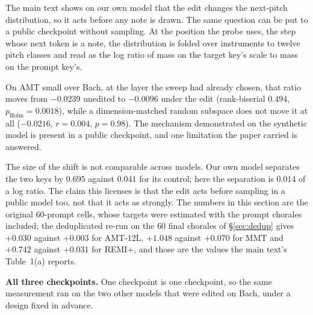 \documentclass{article}
\begin{document}
The main text shows on our own model that the edit changes the next-pitch distribution,
so it acts before any note is drawn. The same question can be put to a public
checkpoint without sampling. At the position the probe uses, the step whose next
token is a note, the distribution is folded over instruments to twelve pitch classes
and read as the log ratio of mass on the target key's scale to mass on the prompt
key's.

On AMT small over Bach, at the layer the sweep had already chosen, that ratio moves from
$-0.0239$ unedited to $-0.0096$ under the edit (rank-biserial $0.494$,
$p_{\text{Holm}} = 0.0018$), while a dimension-matched random subspace does not move it at
all ($-0.0216$, $r = 0.004$, $p = 0.98$). The mechanism demonstrated on the synthetic
model is present in a public checkpoint, and one limitation the paper carried is
answered.

The size of the shift is not comparable across models. Our own model
separates the two keys by $0.695$ against $0.041$ for its control; here the separation
is $0.014$ of a log ratio. The claim this licenses is that the edit acts before
sampling in a public model too, not that it acts as strongly. The numbers in this
section are the original $60$-prompt cells, whose targets were estimated with the prompt
chorales included; the deduplicated re-run on the $60$ final chorales of
\S\ref{sec:dedup} gives $+0.030$ against $+0.003$ for AMT-12L, $+1.048$ against
$+0.070$ for MMT and $+0.742$ against $+0.031$ for REMI+, and those are the values the
main text's Table~1(a) reports.

%
\textbf{All three checkpoints.} One checkpoint is one checkpoint, so the same
measurement ran on the two other models that were edited on Bach, under a design fixed
in advance.
\end{document}
